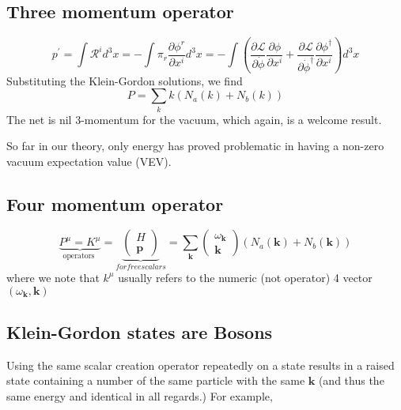 \subsection{Three momentum operator}
\begin{equation}
p^{\prime}=\int  \mathcal{R}^{i} d^{3} x=-\int \pi_{r} \frac{\partial \phi^{r}}{\partial x^{i}} d^{3} x=-\int\left(\frac{\partial \mathcal{L}}{\partial \dot{\phi}} \frac{\partial \phi}{\partial x^{i}}+\frac{\partial \mathcal{L}}{\partial \dot{\phi}^{\dagger}} \frac{\partial \phi^{\dagger}}{\partial x^{i}}\right) d^{3} x
\end{equation}
Substituting the Klein-Gordon solutions, we find
\begin{equation}
P=\sum_{k} k\left(N_{a}(k)+N_{b}(k)\right)
\end{equation}
 The net is nil 3-momentum for the vacuum, which again, is a welcome result.

So far in our theory, only energy has proved problematic in having a non-zero vacuum expectation value (VEV).

\subsection{Four momentum operator}
\begin{equation}
\underbrace{P^{\mu}=K^{\mu}}_{\text {operators }}=\underbrace{\left(\begin{array}{l}
{H} \\
{\mathbf{p}}
\end{array}\right)}_{for free scalars}=\sum_{\mathbf{k}}\left(\begin{array}{c}
{\omega_{\mathbf{k}}} \\
{\mathbf{k}}
\end{array}\right)\left(N_{a}(\mathbf{k})+N_{b}(\mathbf{k})\right)
\end{equation}
where we note that $k^{\mu}$ usually refers to the numeric (not operator) 4 vector $(\omega_{ \mathbf{k}}, \mathbf{k})$

\subsection{Klein-Gordon states are Bosons}
Using the same scalar creation operator repeatedly on a state results in a raised state containing a number of the same particle with the same $\mathbf{k}$ (and thus the same energy and identical in all regards.) For example,


